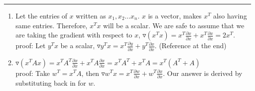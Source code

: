 \documentclass[11pt]{article}
\begin{document}





\begin{quote}

\end{quote}
\hrule


\begin{solution}
\item  
    \begin{enumerate}
        \item Let the entries of $x$ written as $x_1, x_2 ... x_n$. $x$ is a vector, makes $x^T$ also having same entries. Therefore, $x^Tx$ will be a scalar. We are safe to assume that we are taking the gradient with respect to $x$, $\triangledown (x^Tx) = x^T\frac{\partial x}{\partial x} + x^T\frac{\partial x}{\partial x} = 2x^T$.\\
        proof: Let $y^Tx$ be a scalar, $\triangledown y^Tx = x^T\frac{\partial y}{\partial x} + y^T\frac{\partial x}{\partial x}$. (Reference at the end)
        
        \item $\triangledown (x^TAx) = x^TA^T\frac{\partial x}{\partial x} + x^TA\frac{\partial x}{\partial x} = x^TA^T + x^TA = x^T(A^T + A)$\\
        proof: Take $w^T = x^TA$, then $\triangledown w^Tx = x^T\frac{\partial w}{\partial x} + w^T\frac{\partial x}{\partial x}$. Our answer is derived by substituting back in for $w$.  
        

\end{enumerate}
\end{solution}
\end{document}
